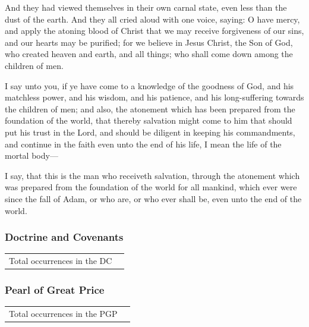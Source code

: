 \begin{compactdesc}
			\item[Mosiah 4:2] And they had viewed themselves in their own carnal state, even less than the dust of the earth.  And they all cried aloud with one voice, saying: O have mercy, and apply the atoning blood of Christ that we may receive forgiveness of our sins, and our hearts may be purified; for we believe in Jesus Christ, the Son of God, who created heaven and earth, and all things; who shall come down among the children of men.
			\item[Mosiah 4:6] I say unto you, if ye have come to a knowledge of the goodness of God, and his matchless power, and his wisdom, and his patience, and his long-suffering towards the children of men; and also, the atonement which has been prepared from the foundation of the world, that thereby salvation might come to him that should put his trust in the Lord, and should be diligent in keeping his commandments, and continue in the faith even unto the end of his life, I mean the life of the mortal body---
			\item[Mosiah 4:7] I say, that this is the man who receiveth salvation, through the atonement which was prepared from the foundation of the world for all mankind, which ever were since the fall of Adam, or who are, or who ever shall be, even unto the end of the world.
		\end{compactdesc}
		
	\subsubsection{Doctrine and Covenants} %
		\label{ATONEMENT-DC}
	
		\begin{tabular}{ll}
			Total occurrences in the DC & 
		\end{tabular}
		
		\begin{compactdesc}
			\item[]
		\end{compactdesc}
		
	\subsubsection{Pearl of Great Price} %
		\label{ATONEMENT-PGP}
	
		\begin{tabular}{ll}
			Total occurrences in the PGP & 
		\end{tabular}
		
